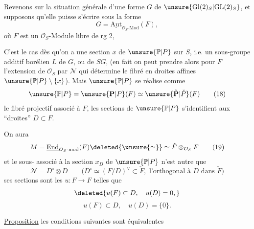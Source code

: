 

Revenons sur la situation générale d'une forme $G$ de $\unsure{\mathrm{Gl}(2)_S|\mathrm{GL}(2)_S}$, et supposons qu'elle puisse s'écrire sous la forme
\[
G=\underline{\mathrm{Aut}}_{\mathcal O_S\text{-Mod}}(F), \tag{17}
\]
où $F$ est un $\mathcal O_S$-Module  libre de rg 2,

C'est le cas dès qu'on a une section $x$ de $\unsure{\mathbb P|P}$ sur $S$, i.e. un sous-groupe additif borélien $L$ de $G$, ou de $SG$, (en fait on peut prendre alors pour $F$ l'extension de $\mathcal O_S$ par $\mathcal N$ qui détermine le fibré en droites affines $\unsure{\mathbb P|P}\setminus\{x\}$). Mais  $\unsure{\mathbb P|P}$ se réalise comme 
\[
\unsure{\mathbb P|P}=\unsure{\mathbf P|P}(F)\simeq\unsure{\check{\mathbf P}|\check P}(F) \tag{18}
\]
le fibré projectif associé à $F$,   les sections de $\unsure{\mathbb P|P}$ s'identifient aux ``droites'' $D\subset F$.

On aura
\[
M=\underline{\mathrm{End}}_{\mathcal O_S\text{-mod}}(F)\deleted{\unsure{\simeq}}\simeq\check F\otimes_{\mathcal O_S}F \tag{19}
\]
et le sous-  associé à la section $x_D$ de $\unsure{\mathbb P|P}$  n'est autre que 
\[
\mathcal N=D^\circ\otimes D
\qquad\bigl(D^\circ\simeq(F/D)^\vee\subset\check F,\text{ l'orthogonal à }D\text{ dans }\check F\bigr) \tag{20}
\]
ses sections sont les $u:F\longrightarrow F$ telles que
\[
\deleted{u(F)\subset D,\quad u(D)=0,}
\]
\[
u(F)\subset D,\quad u(D)=\{0\}. \tag{21}
\]


\uline{Proposition}   les conditions suivantes sont équivalentes

